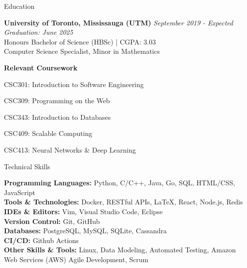 \documentclass[11pt]{resume} %
\begin{document}



\begin{rSection}{Education}

	\textbf{University of Toronto, Mississauga (UTM)} \hfill \textit{September 2019 - Expected Graduation: June 2025} \\
	Honours Bachelor of Science (HBSc) | CGPA: 3.03 \\
	Computer Science Specialist, Minor in Mathematics \\
	\begin{rSubsection}{\textbf{Relevant Coursework}}{}{}{}
		\item CSC301: Introduction to Software Engineering
		\item CSC309: Programming on the Web
		\item CSC343: Introduction to Databases
		\item CSC409: Scalable Computing
		\item CSC413: Neural Networks \& Deep Learning
	\end{rSubsection}
\end{rSection}


\begin{rSection}{Technical Skills}

	\textbf{Programming Languages:} Python, C/C++, Java, Go, SQL, HTML/CSS, JavaScript \\
	\textbf{Tools \& Technologies:} Docker, RESTful APIs, LaTeX, React, Node.js, Redis \\
	\textbf{IDEs \& Editors:} Vim, Visual Studio Code, Eclipse \\
	\textbf{Version Control:} Git, GitHub \\
	\textbf{Databases:} PostgreSQL, MySQL, SQLite, Cassandra \\
	\textbf{CI/CD:} Github Actions \\
	\textbf{Other Skills \& Tools:} Linux, Data Modeling, Automated Testing, Amazon Web Services (AWS) Agile Development, Scrum

\end{rSection}
\end{document}
